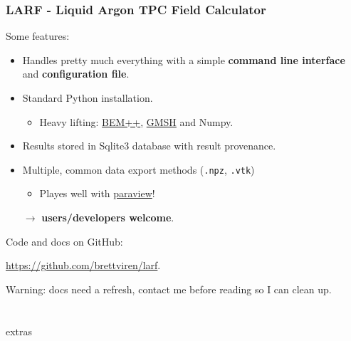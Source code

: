 \documentclass[xcolor=dvipsnames]{beamer}
\begin{document}
\begin{frame}[fragile]
  \frametitle{LARF - \textbf{L}iquid \textbf{Ar}gon TPC \textbf{F}ield Calculator}

  Some features:
  \begin{itemize}
  \item Handles pretty much everything with a simple \textbf{command line interface} and \textbf{configuration file}.
  \item Standard Python installation.
    \begin{itemize}
    \item Heavy lifting: \href{http://www.bempp.org/}{BEM++}, \href{http://gmsh.info/}{GMSH} and Numpy.
    \end{itemize}
  \item Results stored in Sqlite3 database with result provenance.
  \item Multiple, common data export methods (\texttt{.npz}, \texttt{.vtk})
    \begin{itemize}
    \item Playes well with \href{http://www.paraview.org}{paraview}!
    \end{itemize}
  \item[$\rightarrow$] \textbf{users/developers welcome}.
  \end{itemize}

  Code and docs on GitHub:
  \begin{center}
    \url{https://github.com/brettviren/larf}.    
  \end{center}

  \scriptsize Warning: docs need a refresh, contact me before reading so I can clean up.
\end{frame}

\section{}

\begin{frame}
  \begin{center}
      \Huge extras
  \end{center}
\end{frame}
\end{document}
